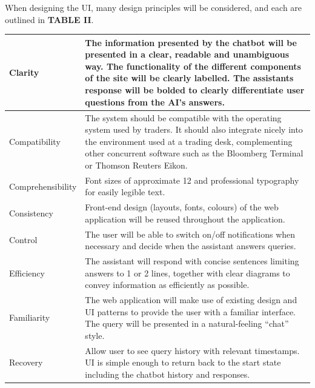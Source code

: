 \documentclass[]{IEEEtran}
\begin{document}
When designing the UI, many design principles will be considered, and each are outlined in \textbf{TABLE II}.
	\begin{table}[h]
	\begin{tabular}{| m{2cm} | m{5.5cm} | }
		\hline
		Clarity & The information presented by the chatbot will be presented in a clear, readable and unambiguous way. The functionality of the different components of the site will be clearly labelled. The assistants response will be bolded to clearly differentiate user questions from the AI’s answers. \\
		
		\hline
		
		Compatibility & The system should be compatible with the operating system used by traders. It should also integrate nicely into the environment used at a trading desk, complementing other concurrent software such as the Bloomberg Terminal or Thomson Reuters Eikon. \\
		
		\hline
		
		Comprehensibility & Font sizes of approximate 12 and professional typography for easily legible text. \\
		
		\hline
		
		Consistency & Front-end design (layouts, fonts, colours) of the web application will be reused throughout the application. \\
		
		\hline
		
		Control & The user will be able to switch on/off notifications when necessary and decide when the assistant answers queries. \\
		
		\hline
		
		Efficiency & The assistant will respond with concise sentences limiting answers to 1 or 2 lines, together with clear diagrams to convey information as efficiently as possible. \\
		
		\hline
		
		Familiarity & The web application will make use of existing design and UI patterns to provide the user with a familiar interface. The query will be presented in a natural-feeling “chat” style. \\
		
		\hline 
		
		Recovery & Allow user to see query history with relevant timestamps. UI is simple enough to return back to the start state including the chatbot history and responses. \\
		

\end{tabular}
\end{table}
\end{document}
